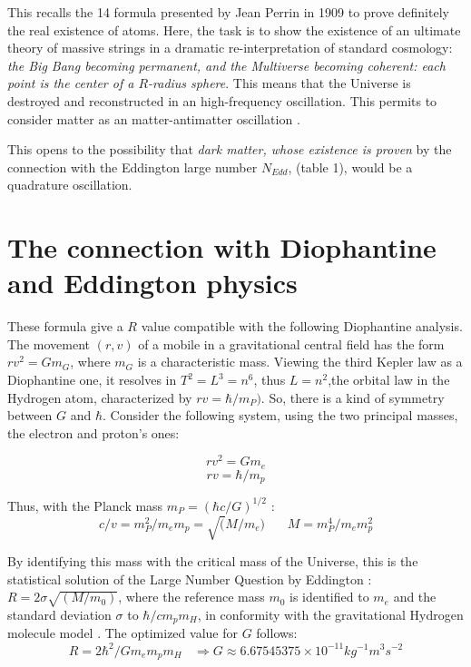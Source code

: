 \documentclass[a4paper,9pt]{article}
\begin{document}
    
    This recalls the 14 formula presented by Jean Perrin in 1909 to prove definitely the real existence of atoms. Here, the task is to show the existence of an ultimate theory of massive strings in a dramatic re-interpretation of standard cosmology:\textit{ the Big Bang becoming permanent, and the Multiverse becoming coherent: each point is the center of a $R$-radius sphere}. This means that the Universe is destroyed and reconstructed in an high-frequency oscillation. This permits to consider matter as an matter-antimatter oscillation \cite{Sanchez2}. 
    
    This opens to the possibility that \textit {dark matter, whose existence is proven} by the connection with the Eddington large number $N_{Edd}$, (table 1), would be a quadrature oscillation.
    
    \section{The connection with Diophantine and Eddington physics}

These formula give a $R$ value compatible with the following Diophantine analysis. The movement $(r,v)$ of a mobile in a gravitational central field has the form $r v^2 = Gm_G$, where $m_G$ is a characteristic mass. Viewing the third Kepler law as a Diophantine one, it resolves in  $T^2 = L^3 = n^6$, thus $L = n^2$,the orbital law in the Hydrogen atom, characterized by $rv = \hbar/m_{P})$. So, there is a kind of symmetry between $G$ and $\hbar$. Consider the following system, using the two principal masses, the electron and proton's ones: 

\begin{equation}
  r v^2 = Gm_e
  \end{equation}
  \begin{equation}
r v = \hbar/m_p  
\end{equation}

Thus, with the Planck mass $m_P = (\hbar c/G)^{1/2}$ : 
\begin{equation}
c/v = m_P^2/m_em_p = \sqrt(M/m_e)~~~~~~~~   M = m_P^4/m_em_p^2
\end{equation}

By identifying this mass with the critical mass of the Universe, this is the statistical solution \cite{Durham} of the Large Number Question by Eddington  : $R = 2 \sigma \sqrt{(M/m_0)}$, where the reference mass $m_0$ is identified to $m_e$ and the standard deviation $\sigma$ to $\hbar/cm_pm_H$, in conformity with the gravitational Hydrogen molecule model \cite{Sanchez}. The optimized value for $G$ follows:
\begin{equation}
R = 2\hbar^2/Gm_em_pm_H  ~~~~  \Rightarrow G \approx 6.67545375 \times 10^{-11}  kg^{-1}m^{3}s^{-2}    
\end{equation}
\end{document}
